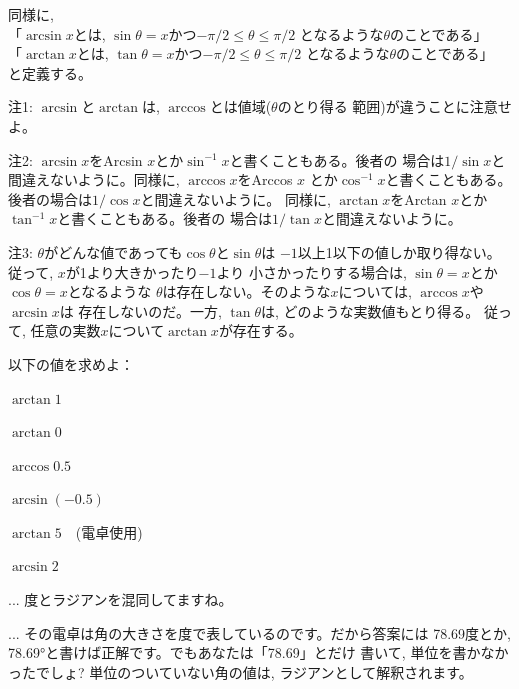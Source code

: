 同様に, \\
「$\arcsin x$とは, $\sin \theta=x$かつ$-\pi/2\leq\theta\leq\pi/2$
となるような$\theta$のことである」\\
「$\arctan x$とは, $\tan \theta=x$かつ$-\pi/2\leq\theta\leq\pi/2$
となるような$\theta$のことである」\\
と定義する。\hv

{\small 注1: $\arcsin$と$\arctan$は, $\arccos$とは値域($\theta$のとり得る
範囲)が違うことに注意せよ。

注2: $\arcsin x$をArcsin $x$とか$\sin^{-1} x$と書くこともある。後者の
場合は$1/\sin x$と間違えないように。同様に, $\arccos x$をArccos $x$
とか$\cos^{-1}x$と書くこともある。後者の場合は$1/\cos x$と間違えないように。
同様に, $\arctan x$をArctan $x$とか$\tan^{-1}x$と書くこともある。後者の
場合は$1/\tan x$と間違えないように。

注3: $\theta$がどんな値であっても$\cos\theta$と$\sin\theta$は
$-1$以上1以下の値しか取り得ない。従って, $x$が1より大きかったり$-1$より
小さかったりする場合は, $\sin\theta=x$とか$\cos\theta=x$となるような
$\theta$は存在しない。そのような$x$については, $\arccos x$や$\arcsin x$は
存在しないのだ。一方, $\tan\theta$は, どのような実数値もとり得る。
従って, 任意の実数$x$について$\arctan x$が存在する。}
\mv

\begin{q}\label{q:trig_arcsin} 以下の値を求めよ：
\begin{edaenumerate}
\item $\arctan 1$
\item $\arctan 0$
\item $\arccos 0.5$
\item $\arcsin (-0.5)$
\item $\arctan 5$　(電卓使用)
\item $\arcsin 2$
\end{edaenumerate}\end{q}

\begin{freqmiss}{\small{} ... 度とラジアンを混同してますね。}\end{freqmiss}

\begin{faq}{\small{}
 ... その電卓は角の大きさを度で表しているのです。だから答案には
78.69度とか, 78.69°と書けば正解です。でもあなたは「78.69」とだけ
書いて, 単位を書かなかったでしょ? 単位のついていない角の値は, 
ラジアンとして解釈されます。}\end{faq}

